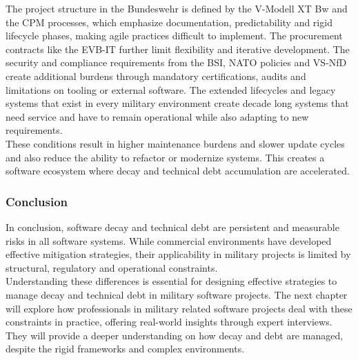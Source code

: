 The project structure in the Bundeswehr is defined by the V-Modell XT Bw and the \ac{CPM} processes, which emphasize documentation, predictability and rigid lifecycle phases, making agile practices difficult to implement.
The procurement contracts like the \ac{EVB-IT} further limit flexibility and iterative development. The security and compliance requirements from the BSI, NATO policies and VS-NfD create additional burdens through mandatory certifications, audits and limitations on tooling or external software.
The extended lifecycles and legacy systems that exist in every military environment create decade long systems that need service and have to remain operational while also adapting to new requirements.\\

These conditions result in higher maintenance burdens and slower update cycles and also reduce the ability to refactor or modernize systems. This creates a software ecosystem where decay and technical debt accumulation are accelerated.\\

\subsubsection{Conclusion}
In conclusion, software decay and technical debt are persistent and measurable risks in all software systems. While commercial environments have developed effective mitigation strategies, their applicability in military projects is limited by structural, regulatory and operational constraints.\\

Understanding these differences is essential for designing effective strategies to manage decay and technical debt in military software projects. The next chapter will explore how professionals in military related software projects deal with these constraints in practice, offering real-world
insights through expert interviews. They will provide a deeper understanding on how decay and debt are managed, despite the rigid frameworks and complex environments.

